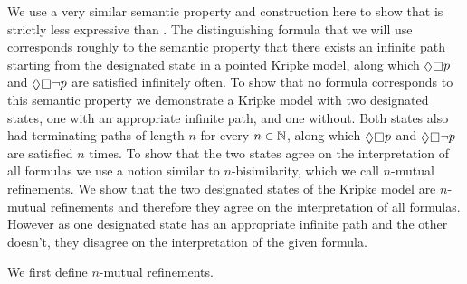 We use a very similar semantic property and construction here to show that \logicRmlKF{} is strictly less expressive than \logicMuKF{}.
The distinguishing \langMu{} formula that we will use corresponds roughly to the semantic property that there exists an infinite path starting from the designated state in a pointed Kripke model, along which $\possible \necessary \atomP$ and $\possible \necessary \lnot \atomP$ are satisfied infinitely often.
To show that no \langRml{} formula corresponds to this semantic property we demonstrate a \classKF{} Kripke model with two designated states, one with an appropriate infinite path, and one without.
Both states also had terminating paths of length $n$ for every $n \in \mathbb{N}$, along which $\possible \necessary \atomP$ and $\possible \necessary \lnot \atomP$ are satisfied $n$ times.
To show that the two states agree on the interpretation of all \langRml{} formulas we use a notion similar to $n$-bisimilarity, which we call $n$-mutual refinements.
We show that the two designated states of the Kripke model are $n$-mutual refinements and therefore they agree on the interpretation of all \langRml{} formulas. 
However as one designated state has an appropriate infinite path and the other doesn't, they disagree on the interpretation of the given \langMu{} formula.

We first define $n$-mutual refinements.

